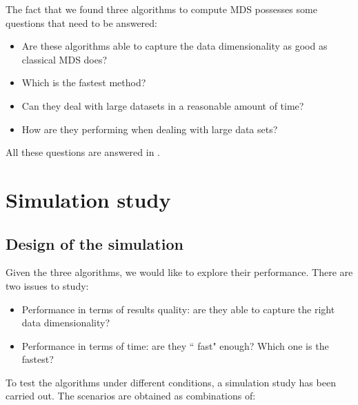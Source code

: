 \documentclass[11pt]{report}
\begin{document}
The fact that we found three algorithms to compute MDS possesses some questions 
that need to be answered:

\begin{itemize}
\item Are these algorithms able to capture the data dimensionality as good as 
classical MDS does?
\item Which is the fastest method?
\item Can they deal with large datasets in a reasonable amount of time?
\item How are they performing when dealing with large data sets?
\end{itemize}

All these questions are answered in .



\chapter{Simulation study}
\label{chap:sim}

\section{Design of the simulation}


Given the three algorithms, we would like to explore their performance.  There 
are two issues to study:

\begin{itemize}
\item Performance in terms of results quality: are they able to capture 
the right data dimensionality?
\item Performance in terms of time: are they `` fast" 
enough? Which one is the fastest?
\end{itemize}

To test the algorithms under different conditions, a simulation study has been
carried out. The scenarios are obtained as combinations of:
\end{document}
